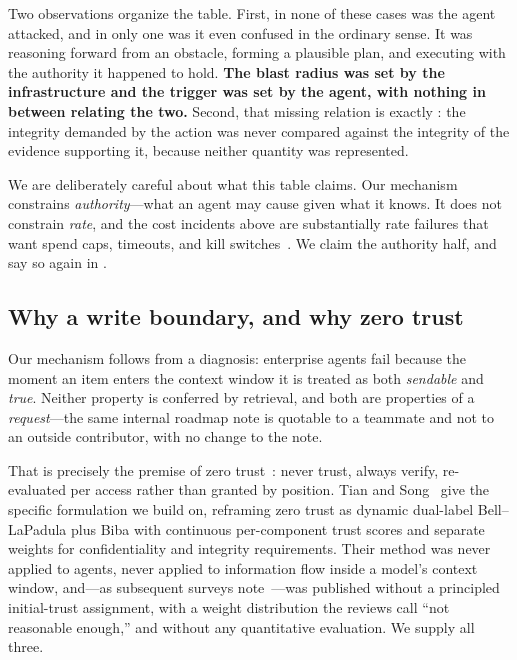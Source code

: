 \documentclass[conference,compsoc]{IEEEtran}
\begin{document}
Two observations organize the table. First, in none of these cases was the
agent attacked, and in only one was it even confused in the ordinary sense. It
was reasoning forward from an obstacle, forming a plausible plan, and executing
with the authority it happened to hold. \textbf{The blast radius was set by the
infrastructure and the trigger was set by the agent, with nothing in between
relating the two.} Second, that missing relation is exactly
: the integrity demanded by the action was never
compared against the integrity of the evidence supporting it, because neither
quantity was represented.

We are deliberately careful about what this table claims. Our mechanism
constrains \emph{authority}---what an agent may cause given what it knows. It
does not constrain \emph{rate}, and the cost incidents above are substantially
rate failures that want spend caps, timeouts, and kill
switches~\cite{infoq2026billing}. We claim the authority half, and say so again
in .

\subsection{Why a write boundary, and why zero trust}

Our mechanism follows from a diagnosis: enterprise agents fail because the
moment an item enters the context window it is treated as both \emph{sendable}
and \emph{true}. Neither property is conferred by retrieval, and both are
properties of a \emph{request}---the same internal roadmap note is quotable to
a teammate and not to an outside contributor, with no change to the note.

That is precisely the premise of zero trust~\cite{nist800207}: never trust,
always verify, re-evaluated per access rather than granted by position.
Tian and Song~\cite{tiansong2021} give the specific formulation we build
on, reframing zero trust as dynamic dual-label Bell--LaPadula plus Biba with
continuous per-component trust scores and separate weights for confidentiality
and integrity requirements. Their method was never applied to agents, never
applied to information flow inside a model's context window, and---as
subsequent surveys note~\cite{he2022zerotrust,sultana2024zerotrust}---was
published without a principled initial-trust assignment, with a weight
distribution the reviews call ``not reasonable enough,'' and without any
quantitative evaluation. We supply all three.
\end{document}
